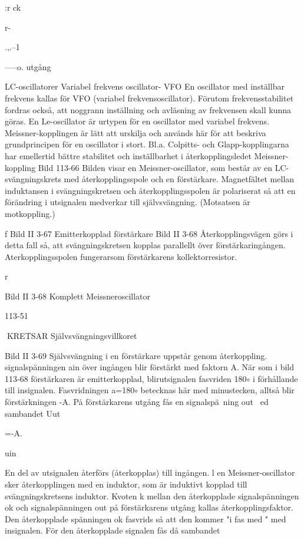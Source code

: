 \documentclass[a4paper,twoside,twocolumn,openright]{book}
\begin{document}
{{{{{{{{:r
ck

r-

.,.--1}-----o.
utgång

LC-oscillatorer
Variabel frekvens oscillator- VFO
En oscillator med inställbar frekvens kallas
för VFO (variabel frekvensoscillator). Förutom frekvensstabilitet fordras också, att
noggrann inställning och avläsning av frekvensen skall kunna göras.
En Le-oscillator är urtypen för en oscillator med variabel frekvens. Meissner-kopplingen är lätt att urskilja och används här för
att beskriva grundprincipen för en oscillator
i stort. Bl.a. Colpitts- och Glapp-kopplingarna har emellertid bättre stabilitet och
inställbarhet i återkopplingsledet
Meissner-koppling
Bild 113-66
Bilden visar en Meissner-oscillator, som består av en LC-svängningskrets med återkopplingsspole och en förstärkare. Magnetfältet mellan induktansen i svängningskretsen och återkopplingsspolen är polariserat
så att en förändring i utsignalen medverkar
till självsvängning. (Motsatsen är motkoppling.)

f
Bild II 3-67 Emitterkopplad förstärkare
Bild II 3-68
Återkopplingsvägen görs i detta fall så, att
svängningskretsen kopplas parallellt över
förstärkaringången. Aterkopplingsspolen
fungerarsom förstärkarens kollektorresistor.

r

Bild II 3-68 Komplett Meissneroscillator

113-51

KRETSAR
Självsvängningsvillkoret

Bild II 3-69
Självsvängning i en förstärkare uppstår genom återkoppling. signalspänningen ain över
ingången blir förstärkt med faktorn A. När
som i bild 113-68 förstärkaren är emitterkopplad, blirutsignalen fasvriden 180$\circ$ i förhållande till insignalen. Fasvridningen a=180$\circ$ betecknas här med minustecken, alltså blir
förstärkningen -A.
På förstärkarens utgång fås en signalspä~ning out ~ed sambandet
Uut

=-A.

uin

En del av utsignalen återförs (återkopplas) till ingången. l en Meissner-oscillator
sker återkopplingen med en induktor, som är
induktivt kopplad till svängningskretsens induktor.
Kvoten k mellan den återkopplade signalspänningen ok och signalspänningen out
på förstärkarens utgång kallas återkopplingsfaktor. Den återkopplade spänningen
ok fasvrids så att den kommer "i fas med "
med insignalen. För den återkopplade signalen fås då sambandet

}}}}}}}
\end{document}
